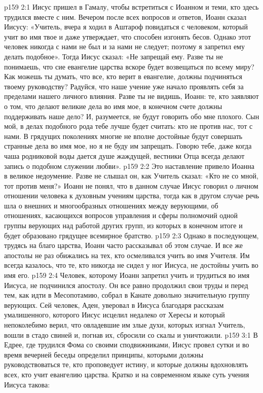 \vs p159 2:1 Иисус пришел в Гамалу, чтобы встретиться с Иоанном и теми, кто здесь трудился вместе с ним. Вечером после всех вопросов и ответов, Иоанн сказал Иисусу: «Учитель, вчера я ходил в Аштароф повидаться с человеком, который учит во имя твое и даже утверждает, что способен изгонять бесов. Однако этот человек никогда с нами не был и за нами не следует; поэтому я запретил ему делать подобное». Тогда Иисус сказал: «Не запрещай ему. Разве ты не понимаешь, что сие евангелие царства вскоре будет возвещаться по всему миру? Как можешь ты думать, что все, кто верит в евангелие, должны подчиняться твоему руководству? Радуйся, что наше учение уже начало проявлять себя за пределами нашего личного влияния. Разве ты не видишь, Иоанн: те, кто заявляют о том, что делают великие дела во имя мое, в конечном счете должны поддерживать наше дело? И, разумеется, не будут говорить обо мне плохого. Сын мой, в делах подобного рода тебе лучше будет считать: кто не против нас, тот с нами. В грядущих поколениях многие не вполне достойные будут совершать странные дела во имя мое, но я не буду им запрещать. Говорю тебе, даже когда чаша родниковой воды дается душе жаждущей, вестники Отца всегда делают запись о подобном служении любви».
\vs p159 2:2 Это наставление привело Иоанна в великое недоумение. Разве не слышал он, как Учитель сказал: «Кто не со мной, тот против меня?» Иоанн не понял, что в данном случае Иисус говорил о личном отношении человека к духовным учениям царства, тогда как в другом случае речь шла о внешних и многообразных отношениях между верующими, об отношениях, касающихся вопросов управления и сферы полномочий одной группы верующих над работой других групп, из которых в конечном итоге и будет образовано грядущее всемирное братство.
\vs p159 2:3 Однако в последующем, трудясь на благо царства, Иоанн часто рассказывал об этом случае. И все же апостолы не раз обижались на тех, кто осмеливался учить во имя Учителя. Им всегда казалось, что те, кто никогда не сидел у ног Иисуса, не достойны учить во имя его.
\vs p159 2:4 Человек, которому Иоанн запретил учить и трудиться во имя Иисуса, не подчинился апостолу. Он все равно продолжил свои труды и перед тем, как идти в Месопотамию, собрал в Канате довольно значительную группу верующих. Сей человек, Аден, уверовал в Иисуса благодаря рассказам умалишенного, которого Иисус исцелил недалеко от Хересы и который непоколебимо верил, что овладевшие им злые духи, которых изгнал Учитель, вошли в стадо свиней и, погнав их, сбросили со скалы и уничтожили.
\vs p159 3:1 В Едрее, где трудился Фома со своими сподвижниками, Иисус провел сутки и во время вечерней беседы определил принципы, которыми должны руководствоваться те, кто проповедует истину, и которые должны вдохновлять всех, кто учит евангелию царства. Кратко и на современном языке суть учения Иисуса такова:
